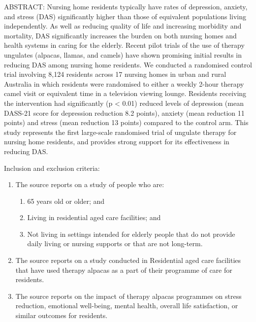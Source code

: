 \documentclass{article}
\begin{document}
\begin{description}
  ABSTRACT: Nursing home residents typically have rates of depression, anxiety,
  and stress (DAS) significantly higher than those of equivalent populations
  living independently. As well as reducing quality of life and increasing
  morbidity and mortality, DAS significantly increases the burden on both
  nursing homes and health systems in caring for the elderly. Recent pilot
  trials of the use of therapy ungulates (alpacas, llamas, and camels) have
  shown promising initial results in reducing DAS among nursing home residents.
  We conducted a randomised control trial involving 8,124 residents across 17
  nursing homes in urban and rural Australia in which residents were randomised
  to either a weekly 2-hour therapy camel visit or equivalent time in a
  television viewing lounge. Residents receiving the intervention had
  significantly (p < 0.01) reduced levels of depression (mean DASS-21 score for
  depression reduction 8.2 points), anxiety (mean reduction 11 points) and
  stress (mean reduction 13 points) compared to the control arm. This study
  represents the first large-scale randomised trial of ungulate therapy for
  nursing home residents, and provides strong support for its effectiveness in
  reducing DAS.

  \GPT Inclusion and exclusion criteria:

  \begin{enumerate}[label=\arabic*.\ ]
    \item The source reports on a study of people who are:
    \begin{enumerate}[label=\arabic{enumi}\alph*.\ ]
      \item 65 years old or older; and
      \item Living in residential aged care facilities; and
      \item Not living in settings intended for elderly people that do not
        provide daily living or nursing supports or that are not long-term.
    \end{enumerate}
    \item The source reports on a study conducted in Residential aged care
      facilities that have used therapy alpacas as a part of their programme of
      care for residents.
    \item The source reports on the impact of therapy alpacas programmes on
      stress reduction, emotional well-being, mental health, overall life
      satisfaction, or similar outcomes for residents.
  \end{enumerate}


\end{description}
\end{document}
